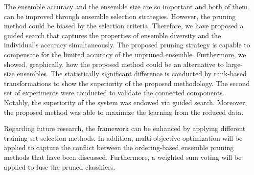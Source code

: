 The ensemble accuracy and the ensemble size are so important and both of them can be improved through ensemble selection strategies. However, the pruning method could be biased by the selection criteria. Therefore, we have proposed a guided search that captures the properties of ensemble diversity and the individual's accuracy simultaneously. The proposed pruning strategy is capable to compensate for the limited accuracy of the unpruned ensemble. Furthermore, we showed, graphically, how the proposed method could be an alternative to large-size ensembles. The statistically significant difference is conducted by rank-based transformations to show the superiority of the proposed methodology. The second set of experiments were conducted to validate the connected components. Notably, the superiority of the system was endowed via guided search. Moreover, the proposed method was able to maximize the learning from the reduced data.


Regarding future research, the framework can be enhanced by applying different training set selection methods. In addition, multi-objective optimization will be applied to capture the conflict between the ordering-based ensemble pruning methods that have been discussed.  Furthermore, a weighted sum voting will be applied to fuse the pruned classifiers. 


